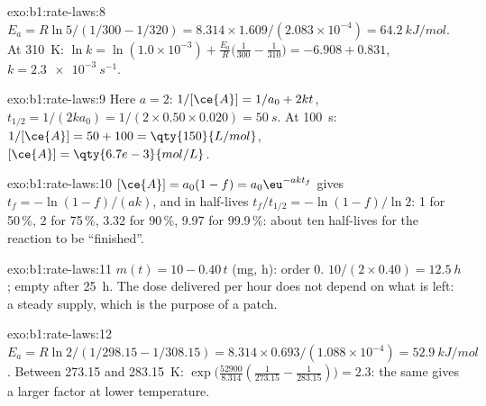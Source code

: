 \begin{solution}{exo:b1:rate-laws:8}
$E_a = R\ln5/(1/300 - 1/320) = 8.314 \times 1.609/(2.083 \times 10^{-4}) =
\qty{64.2}{kJ/mol}$. At \qty{310}{K}: $\ln k = \ln(1.0 \times 10^{-3}) +
\frac{E_a}{R}\big(\frac{1}{300} - \frac{1}{310}\big) = -6.908 + 0.831$,
$k = \qty{2.3e-3}{s^{-1}}$.
\end{solution}

\begin{solution}{exo:b1:rate-laws:9}
Here $a = 2$: $1/[\ce{A}] = 1/a_0 + 2kt$, $t_{1/2} = 1/(2k a_0) = 1/(2
\times 0.50 \times 0.020) = \qty{50}{s}$. At \qty{100}{s}: $1/[\ce{A}] = 50
+ 100 = \qty{150}{L/mol}$, $[\ce{A}] = \qty{6.7e-3}{mol/L}$.
\end{solution}

\begin{solution}{exo:b1:rate-laws:10}
$[\ce{A}] = a_0(1 - f) = a_0\eu^{-akt_f}$ gives $t_f = -\ln(1-f)/(ak)$, and
in half-lives $t_f/t_{1/2} = -\ln(1-f)/\ln2$: 1 for 50\,\%, 2 for 75\,\%,
3.32 for 90\,\%, 9.97 for 99.9\,\%: about ten half-lives for the reaction
to be ``finished''.
\end{solution}

\begin{solution}{exo:b1:rate-laws:11}
$m(t) = 10 - 0.40\,t$ (\unit{mg}, \unit{h}): order 0. 
$10/(2 \times 0.40) = \qty{12.5}{h}$; empty after \qty{25}{h}. The dose
delivered per hour does not depend on what is left: a steady supply, which
is the purpose of a patch.
\end{solution}

\begin{solution}{exo:b1:rate-laws:12}
$E_a = R\ln2/(1/298.15 - 1/308.15) = 8.314 \times 0.693/(1.088 \times
10^{-4}) = \qty{52.9}{kJ/mol}$. Between 273.15 and \qty{283.15}{K}:
$\exp\big(\frac{52900}{8.314}(\frac{1}{273.15} - \frac{1}{283.15})\big) =
2.3$: the same  gives a larger factor at lower
temperature.
\end{solution}

